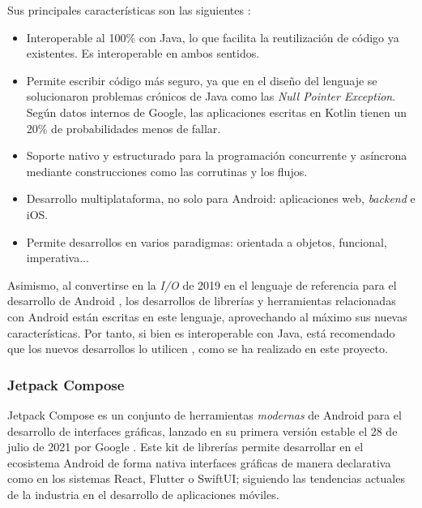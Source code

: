             Sus principales características son las siguientes \cite{noauthor_kotlin_nodate} \cite{noauthor_enfoque_nodate}:
            \begin{itemize}
                \item Interoperable al 100\% con Java, lo que facilita la reutilización de código ya existentes. 
                Es interoperable en ambos sentidos.
                \item Permite escribir código más seguro, ya que en el diseño del lenguaje se solucionaron problemas
                crónicos de Java como las \textit{Null Pointer Exception}. Según datos internos de Google, las 
                aplicaciones escritas en Kotlin tienen un 20\% de probabilidades menos de fallar.
                \item Soporte nativo y estructurado para la programación concurrente y asíncrona mediante 
                construcciones como las corrutinas y los flujos.
                \item Desarrollo multiplataforma, no solo para Android: aplicaciones web, \textit{backend} e iOS.
                \item Permite desarrollos en varios paradigmas: orientada a objetos, funcional, imperativa...
            \end{itemize}
            
            Asimismo, al convertirse en la \textit{I/O} de 2019 en el lenguaje de referencia para el desarrollo 
            de Android \cite{braun_celebrating_2022}, los desarrollos de librerías y herramientas relacionadas con 
            Android están escritas en este lenguaje, aprovechando al máximo sus nuevas características. Por tanto, si
            bien es interoperable con Java, está recomendado que los nuevos desarrollos lo utilicen 
            \cite{lardinois_kotlin_2019}, como se ha realizado en este proyecto.
            
        \subsubsection{Jetpack Compose}

            Jetpack Compose es un conjunto de herramientas \textit{modernas} de Android para el desarrollo de 
            interfaces gráficas, lanzado en su primera versión estable el 28 de julio de 2021 por Google
            \cite{bellini_jetpack_2021}. Este kit de librerías permite desarrollar en el ecosistema Android de 
            forma nativa interfaces gráficas de manera declarativa como en los sistemas React, Flutter o SwiftUI;
            siguiendo las tendencias actuales de la industria en el desarrollo de aplicaciones móviles. 

